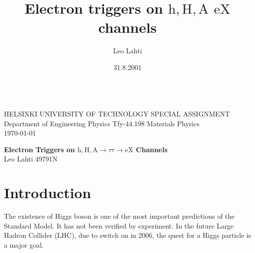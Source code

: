 \documentclass[a4paper,12pt,titlepage]{article}
\title{Electron triggers on $\mathrm{h, H, A}$ \rightarrow  \tau \tau \rightarrow $\mathrm{eX}$ channels}
\author{Leo Lahti}
\date{31.8.2001}
\begin{document}
\newcommand{\mycaption}[1]{\caption{\small{#1}}}

\newcommand{\Pem}{\mbox{$\mathrm{e}^-$}}             %
\newcommand{\Pep}{\mbox{$\mathrm{e}^+$}}             %

\newcommand{\Hpm}{\mbox{$\mathrm{H}^{\pm}$}}         %
\newcommand{\PHz}{\mbox{$\mathrm{H}^0$}}             %
\newcommand{\Phz}{\mbox{$\mathrm{h}^0$}}             %

\newcommand{\Pgne}{\mbox{$\nu_e$}}                   %
\newcommand{\Pagne}{\mbox{$\overline{\nu}_e$}}       %
\newcommand{\Pgngt}{\mbox{$\nu_\tau$}}               %
\newcommand{\Pagngt}{\mbox{$\overline{\nu}_\tau$}}   %

\newcommand{\ptele}{\mbox{${p^e_T}$}}                %

\begin{titlepage}
  \begin{tabbing}
    \hspace*{9cm} \= \\
    HELSINKI UNIVERSITY OF TECHNOLOGY \> SPECIAL ASSIGNMENT \\
    Department of Engineering Physics \> Tfy-44.198 Materials Physics \\ 
    \> \today \\
  \end{tabbing}
  \vspace{4cm}
  \begin{center}
    {\large {\bf Electron Triggers on $\mathrm{h, H, A} \rightarrow  \tau \tau \rightarrow \mathrm{eX}$ Channels}}
    \vspace{10cm} \\
    Leo Lahti\linebreak
    49791N
    \vspace{2.5cm}
  \end{center}
\end{titlepage}

\tableofcontents 
\pagebreak
\pagebreak

\section{Introduction}
The existence of Higgs boson is one of the most important predictions of the Standard Model. It has not been verified by experiment. In the future Large Hadron Collider (LHC), due to switch on in 2006, the quest for a Higgs particle is a major goal. 
\end{document}
